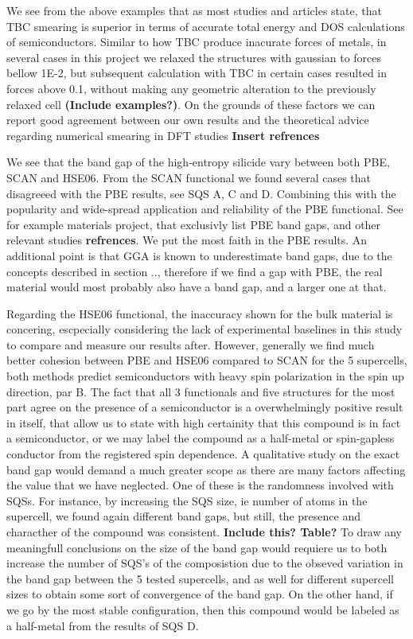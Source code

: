 We see from the above examples that as most studies and articles state, that TBC smearing is superior in terms of accurate total energy and DOS calculations of semiconductors. Similar to how TBC produce inacurate forces of metals, in several cases in this project we relaxed the structures with gaussian to forces bellow 1E-2, but subsequent calculation with TBC in certain cases resulted in forces above 0.1, without making any geometric alteration to the previously relaxed cell \textbf{(Include examples?)}. On the grounds of these factors we can report good agreement between our own results and the theoretical advice regarding numerical smearing in DFT studies \textbf{Insert refrences}

We see that the band gap of the high-entropy silicide vary between both PBE, SCAN and HSE06. From the SCAN functional we found several cases that disagreeed with the PBE results, see SQS A, C and D. Combining this with the popularity and wide-spread application and reliability of the PBE functional. See for example materials project, that exclusivly list PBE band gaps, and other relevant studies \textbf{refrences}. We put the most faith in the PBE results. An additional point is that GGA is known to underestimate band gaps, due to the concepts described in section .., therefore if we find a gap with PBE, the real material would most probably also have a band gap, and a larger one at that.

Regarding the HSE06 functional, the inaccuracy shown for the bulk material is concering, escpecially considering the lack of experimental baselines in this study to compare and measure our results after. However, generally we find much better cohesion between PBE and HSE06 compared to SCAN for the 5 supercells, both methods predict semiconductors with heavy spin polarization in the spin up direction, par B. The fact that all 3 functionals and five structures for the most part agree on the presence of a semiconductor is a overwhelmingly positive result in itself, that allow us to state with high certainity that this compound is in fact a semiconductor, or we may label the compound as a half-metal or spin-gapless conductor from the registered spin dependence. A qualitative study on the exact band gap would demand a much greater scope as there are many factors affecting the value that we have neglected. One of these is the randomness involved with SQSs. For instance, by increasing the SQS size, ie number of atoms in the supercell, we found again different band gaps, but still, the presence and characther of the compound was consistent. \textbf{Include this? Table?} To draw any meaningfull conclusions on the size of the band gap would requiere us to both increase the number of SQS's of the composistion due to the obseved variation in the band gap between the 5 tested supercells, and as well for different supercell sizes to obtain some sort of convergence of the band gap. On the other hand, if we go by the most stable configuration, then this compound would be labeled as a half-metal from the results of SQS D.  

